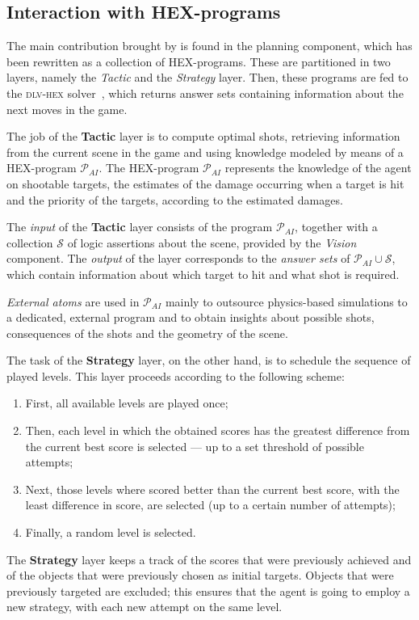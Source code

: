 \subsection{Interaction with HEX-programs}

The main contribution brought by \ah is
found in the planning component, which has
been rewritten as a collection of HEX-programs.
These are partitioned in two layers, namely
the \emph{Tactic} and the \emph{Strategy} layer.
Then, these programs are fed to the
\textsc{dlv-hex} solver~\cite{dlvHEX},
which returns answer sets containing
information about the next moves in the game.

The job of the \textbf{Tactic} layer is to compute optimal shots, retrieving information from the current scene in the game and using knowledge modeled by means of a HEX-program \(\mathcal{P}_{AI}\).
The HEX-program \(\mathcal{P}_{AI}\) represents the knowledge of the agent on shootable targets, the estimates of the damage occurring when a target is hit and the priority of the targets, according to the estimated damages.

The \emph{input} of the \textbf{Tactic} layer consists of the program \(\mathcal{P}_{AI}\), together with a collection \(\mathcal{S}\) of logic assertions about the scene, provided by the \emph{Vision} component.
The \emph{output} of the layer corresponds to the \emph{answer sets} of \(\mathcal{P}_{AI} \cup \mathcal{S}\), which contain information about which target to hit and what shot is required.

\emph{External atoms} are used in \(\mathcal{P}_{AI}\) mainly to outsource physics-based simulations to a dedicated, external program and to obtain insights about possible shots, consequences of the shots and the geometry of the scene.

The task of the \textbf{Strategy} layer, on the other hand, is to schedule the sequence of played levels. This layer proceeds according to the following scheme:
\begin{enumerate}
    \item First, all available levels are played once;
    \item Then, each level in which the obtained scores has the greatest difference from the current best score is selected --- up to a set threshold of possible attempts;
    \item Next, those levels where \ah scored better than the current best score, with the least difference in score, are selected (up to a certain number of attempts);
    \item Finally, a random level is selected. 
\end{enumerate}

The \textbf{Strategy} layer keeps a track of the scores that were previously achieved and of the objects that were previously chosen as initial targets.
Objects that were previously targeted are excluded; this ensures that the agent is going to employ a new strategy, with each new attempt on the same level.